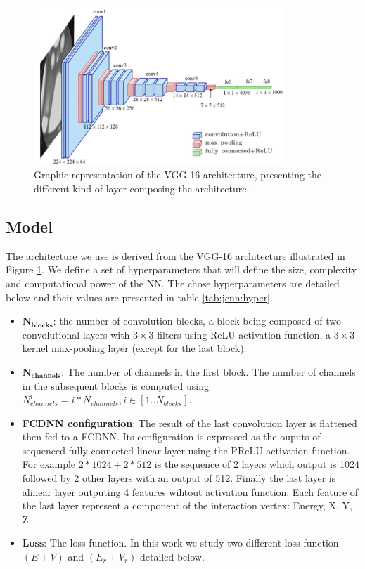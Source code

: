 \documentclass[../main.tex]{subfiles}
\begin{document}
\begin{figure}[ht]
  \centering
  \includegraphics[height=6cm]{images/jcnn/vgg16.png}
  \caption{Graphic representation of the VGG-16 architecture, presenting the different kind of layer composing the architecture.}
  \label{fig:jcnn:vgg16}
\end{figure}

\subsection{Model}
\label{sec:jcnn:model}

The architecture we use is derived from the VGG-16 architecture \cite{simonyan_very_2015} illustrated in Figure \ref{fig:jcnn:vgg16}. We define a set of hyperparameters that will define the size, complexity and computational power of the NN. The chose hyperparameters are detailed below and their values are presented in table \ref{tab:jcnn:hyper}.
\begin{itemize}
  \item $\mathbf{N_{blocks}}$: the number of convolution blocks, a block being composed of two convolutional layers with $3\times3$ filters using ReLU activation function, a $3\times3$ kernel max-pooling layer  (except for the last block).
  \item $\mathbf{N_{channels}}$: The number of channels in the first block. The number of channels in the subsequent blocks is computed using $N^i_{channels} = i * N_{channels}, i \in [1..N_{blocks}]$.
  \item \textbf{FCDNN configuration}: The result of the last convolution layer is flattened then fed to a FCDNN. Its configuration is expressed as the ouputs of sequenced fully connected linear layer using the PReLU activation function. For example $2 * 1024 + 2 * 512$ is the sequence of 2 layers which output is 1024 followed by 2 other layers with an output of 512. Finally the last layer is alinear layer outputing 4 features wihtout activation function. Each feature of the last layer represent a component of the interaction vertex: Energy, X, Y, Z.
  \item \textbf{Loss}: The loss function. In this work we study two different loss function $(E+V)$ and $(E_r + V_r)$ detailed below.
\end{itemize}
\end{document}
